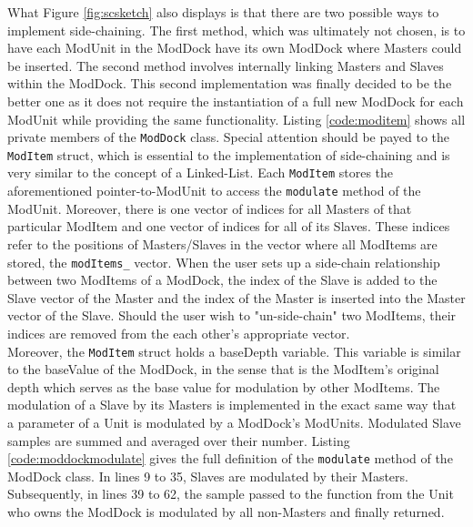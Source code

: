 \documentclass[12pt,twoside]{report}
\begin{document}
\noindent What Figure \ref{fig:scsketch} also displays is that there are two possible ways to implement side-chaining. The first method, which was ultimately not chosen, is to have each ModUnit in the ModDock have its own ModDock where Masters could be inserted. The second method involves internally linking Masters and Slaves within the ModDock. This second implementation was finally decided to be the better one as it does not require the instantiation of a full new ModDock for each ModUnit while providing the same functionality. Listing \ref{code:moditem} shows all private members of the \texttt{ModDock} class. Special attention should be payed to the \texttt{ModItem} struct, which is essential to the implementation of side-chaining and is very similar to the concept of a Linked-List. Each \texttt{ModItem} stores the aforementioned pointer-to-ModUnit to access the \texttt{modulate} method of the ModUnit. Moreover, there is one vector of indices for all Masters of that particular ModItem and one vector of indices for all of its Slaves. These indices refer to the positions of Masters/Slaves in the vector where all ModItems are stored, the \texttt{modItems\_} vector. When the user sets up a side-chain relationship between two ModItems of a ModDock, the index of the Slave is added to the Slave vector of the Master and the index of the Master is inserted into the Master vector of the Slave. Should the user wish to "un-side-chain" two ModItems, their indices are removed from the each other's appropriate vector.\\

\noindent Moreover, the \texttt{ModItem} struct holds a baseDepth variable. This variable is similar to the baseValue of the ModDock, in the sense that is the ModItem's original depth which serves as the base value for modulation by other ModItems. The modulation of a Slave by its Masters is implemented in the exact same way that a parameter of a Unit is modulated by a ModDock's ModUnits. Modulated Slave samples are summed and averaged over their number. Listing \ref{code:moddockmodulate} gives the full definition of the \texttt{modulate} method of the ModDock class. In lines 9 to 35, Slaves are modulated by their Masters. Subsequently, in lines 39 to 62, the sample passed to the function from the Unit who owns the ModDock is modulated by all non-Masters and finally returned.
\end{document}
